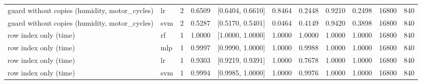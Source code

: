 \begin{tabular}{lllllllllll}
guard without copies (humidity, motor\_cycles) & lr & 2 & 0.6509 & [0.6404, 0.6610] & 0.8464 & 0.2448 & 0.9210 & 0.2498 & 16800 & 840 \\
guard without copies (humidity, motor\_cycles) & svm & 2 & 0.5287 & [0.5170, 0.5401] & 0.0464 & 0.4149 & 0.9420 & 0.3898 & 16800 & 840 \\
row index only (time) & rf & 1 & 1.0000 & [1.0000, 1.0000] & 1.0000 & 1.0000 & 1.0000 & 1.0000 & 16800 & 840 \\
row index only (time) & mlp & 1 & 0.9997 & [0.9990, 1.0000] & 1.0000 & 0.9988 & 1.0000 & 1.0000 & 16800 & 840 \\
row index only (time) & lr & 1 & 0.9303 & [0.9219, 0.9391] & 1.0000 & 0.7678 & 1.0000 & 1.0000 & 16800 & 840 \\
row index only (time) & svm & 1 & 0.9994 & [0.9985, 1.0000] & 1.0000 & 0.9976 & 1.0000 & 1.0000 & 16800 & 840 \\
\bottomrule
\end{tabular}
